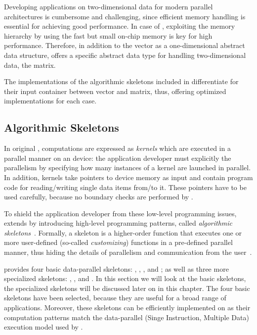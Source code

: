 Developing applications on two-dimensional data for modern parallel architectures is cumbersome and challenging, since efficient memory handling is essential for achieving good performance.
In case of \GPUs, exploiting the memory hierarchy by using the fast but small on-chip memory is key for high performance.
Therefore, in addition to the vector as a one-dimensional abstract data structure, \SkelCL offers a specific abstract data type for handling two-dimensional data, the matrix.

The implementations of the algorithmic skeletons included in \SkelCL differentiate for their input container between vector and matrix, thus, offering optimized implementations for each case.


\subsection{Algorithmic Skeletons}
\label{section:skelcl-programming-model:skeletons}
In original \OpenCL, computations are expressed as \emph{kernels} which are executed in a parallel manner on an \OpenCL device:
the application developer must explicitly the parallelism by specifying how many instances of a kernel are launched in parallel.
In addition, kernels take pointers to device memory as input and contain program code for reading/writing single data items from/to it.
These pointers have to be used carefully, because no boundary checks are performed by \OpenCL.

To shield the application developer from these low-level programming issues, \SkelCL extends \OpenCL by introducing high-level programming patterns, called \emph{algorithmic skeletons}~\cite{Cole1991}.
Formally, a skeleton is a higher-order function that executes one or more user-defined (so-called \emph{customizing}) functions in a pre-defined parallel manner, thus hiding the details of parallelism and communication from the user~\cite{GorlatchCo2011}.

\SkelCL provides four basic data-parallel skeletons: \map, \zip, \reduce, and \scan;
as well as three more specialized skeletons: \mapOverlap, \stencil, and \allpairs.
In this section we will look at the basic skeletons, the specialized skeletons will be discussed later on in this chapter.
The four basic skeletons have been selected, because they are useful for a broad range of applications.
Moreover, these skeletons can be efficiently implemented on \GPUs as their computation patterns match the data-parallel \SIMD (Singe Instruction, Multiple Data) execution model used by \GPUs.

